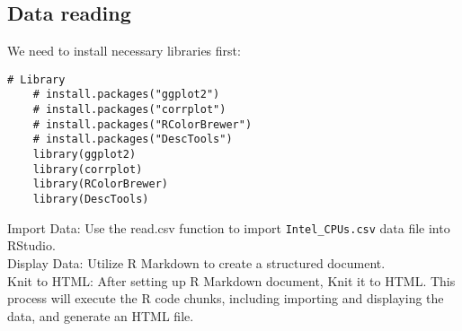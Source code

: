 \documentclass[a4paper]{article}
\begin{document}
	\subsection{Data reading}
	We need to install necessary libraries first:
	\begin{lstlisting}[frame=single, backgroundcolor=\color{gray!10}, breaklines=true, columns=fullflexible]
	# Library
	# install.packages("ggplot2")
	# install.packages("corrplot")
	# install.packages("RColorBrewer")
	# install.packages("DescTools")
	library(ggplot2)
	library(corrplot)
	library(RColorBrewer)
	library(DescTools)
	\end{lstlisting}
	Import Data: Use the read.csv function to import \texttt{Intel\_CPUs.csv} data file into RStudio.\\
	Display Data: Utilize R Markdown to create a structured document.\\
	Knit to HTML: After setting up R Markdown document, Knit it to HTML. This process will execute the R code chunks, including importing and displaying the data, and generate an HTML file.\\
	
\end{document}
